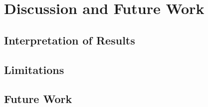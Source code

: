 \chapter{Discussion and Future Work}
\label{ch:discussion}

\section{Interpretation of Results}
\section{Limitations}
\section{Future Work}
